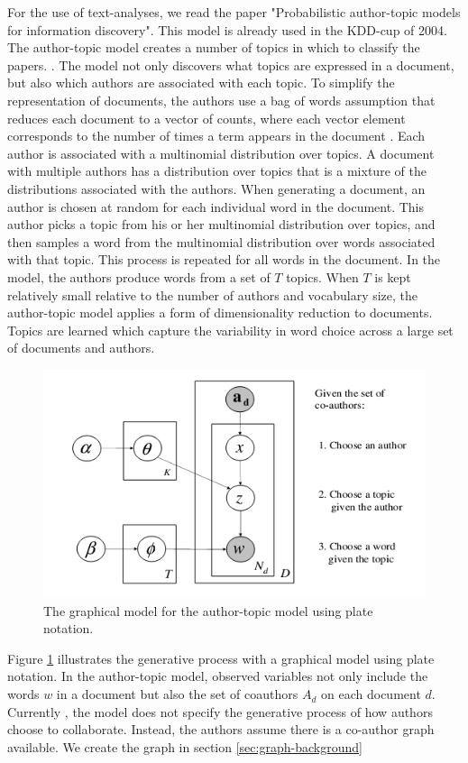 

For the use of text-analyses, we read the paper "Probabilistic author-topic models for information discovery". This model is already used in the KDD-cup of 2004. The author-topic model creates a number of topics in which to classify the papers.  \cite{steyvers2004probabilistic}. The model not only discovers what topics are expressed in a document, but also which authors are associated with each topic. To simplify the representation of documents, the authors use a bag of words assumption that reduces each document to a vector of counts, where each vector element corresponds to the number of times a term appears in the document \cite{chowdhury2010introduction}. Each author is associated with a multinomial distribution over topics. A document with multiple authors has a distribution over topics that is a mixture of the distributions associated with the authors. When generating a document, an author is chosen at random for each individual word in the document. This author picks a topic from his or her multinomial distribution over topics, and then samples a word from the multinomial distribution over words associated with that topic. This process is repeated for all words in the document. In the model, the authors produce words from a set of $T$ topics. When $T$ is kept relatively small relative to the number of authors and vocabulary size, the author-topic model applies a form of dimensionality reduction to documents. Topics are learned which capture the variability in word choice across a large set of documents and authors. 

\begin{figure}
\begin{center}
	\includegraphics[scale=1]{./Images/model.png}
	\caption{The graphical model for the author-topic
model using plate notation.\cite{steyvers2004probabilistic} \label{fig:model}}
\end{center}
\end{figure}

Figure \ref{fig:model} illustrates the generative process with a graphical model using plate notation. In the author-topic model, observed variables not only include the words $w$ in a document but also the set of coauthors $A_d$ on each document $d$. Currently , the model does not specify the generative process of how authors choose to collaborate. Instead, the authors assume there is a co-author graph available. We create the graph in section \ref{sec:graph-background}
